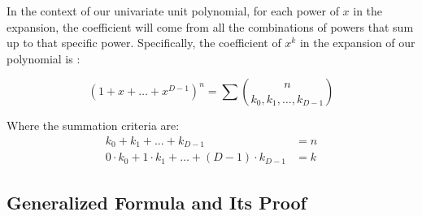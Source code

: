 \documentclass{article}
\theoremstyle{plain}
\theoremstyle{definition}
\begin{document}
In the context of our univariate unit polynomial, for each power of \(x\) in the expansion, the coefficient will come from all the combinations of powers that sum up to that specific power. Specifically, the coefficient of \(x^k\) in the expansion of our polynomial is \cite{brualdi2010intro}:

\begin{equation}
[x^k](1 + x + \ldots + x^{D-1})^n = \sum \binom{n}{k_0, k_1, \ldots, k_{D-1}}
\end{equation}

Where the summation criteria are:
\begin{align}
    k_0 + k_1 + \ldots + k_{D-1} &= n \\
    0 \cdot k_0 + 1 \cdot k_1 + \ldots + (D-1) \cdot k_{D-1} &= k
\end{align}

\subsection{Generalized Formula and Its Proof}
\end{document}

